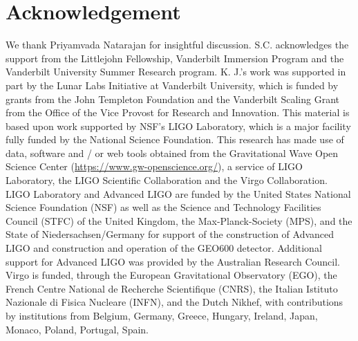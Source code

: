 \documentclass[twocolumn]{aastex631}
\begin{document}
\section{Acknowledgement}
We thank Priyamvada Natarajan for insightful discussion. S.C. acknowledges the support from the Littlejohn Fellowship, Vanderbilt Immersion Program and the Vanderbilt University Summer Research program. K. J.’s work was supported in part by the Lunar Labs Initiative at Vanderbilt
University, which is funded by grants from the John Templeton Foundation and the Vanderbilt Scaling Grant from the Office of the Vice Provost for Research and Innovation. This material is based upon work supported by NSF’s LIGO Laboratory, which is a major facility fully funded by the National Science Foundation. This research has made use of data, software and / or web tools obtained from the Gravitational Wave Open Science Center (\url{https://www.gw-openscience.org/}), a service of LIGO Laboratory, the LIGO Scientific Collaboration and the Virgo Collaboration. LIGO Laboratory and Advanced LIGO are funded by the United States National Science Foundation (NSF) as well as the Science and Technology Facilities Council (STFC) of the United Kingdom, the Max-Planck-Society (MPS), and the State of Niedersachsen/Germany for support of the construction of Advanced LIGO and construction and operation of the GEO600 detector. Additional support for Advanced LIGO was provided by the Australian Research Council. Virgo is funded, through the European Gravitational Observatory (EGO), the French Centre National de Recherche Scientifique (CNRS), the Italian Istituto Nazionale di Fisica Nucleare (INFN), and the Dutch Nikhef, with contributions by institutions from Belgium, Germany, Greece, Hungary, Ireland, Japan, Monaco, Poland, Portugal, Spain.

%  

\end{document}
